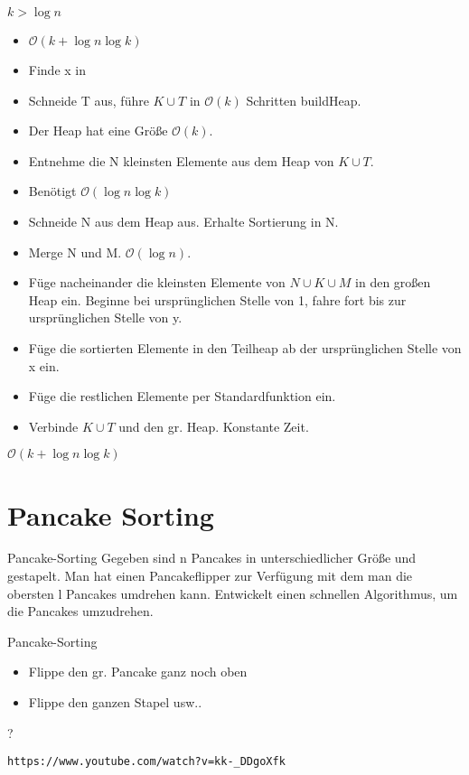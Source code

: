 \documentclass[18pt]{beamer}
\newcommand{\Oh}{\mathcal{O}}
\begin{document}
\begin{frame}{$k > \log n$}
 
 \begin{itemize}
  \item $\Oh(k + \log n \log k)$
  \item Finde x in
  \item Schneide T aus, führe $K \cup T$ in $\Oh(k)$ Schritten buildHeap.
  \item Der Heap hat eine Größe $\Oh(k)$.
  \item Entnehme die N kleinsten Elemente aus dem Heap von $K \cup T$.
  \item Benötigt $\Oh(\log n \log k)$
  \item Schneide N aus dem Heap aus. Erhalte Sortierung in N.
  \item Merge N und M. $\Oh(\log n)$.
 \item Füge nacheinander die kleinsten Elemente von $N \cup K \cup M$ in den 
 großen Heap ein. Beginne bei ursprünglichen Stelle von 1, fahre fort bis zur ursprünglichen Stelle von y.
 \item Füge die sortierten Elemente in den Teilheap ab der ursprünglichen Stelle von x ein.
 \item Füge die restlichen Elemente per Standardfunktion ein.
 \item Verbinde $K \cup T$ und den gr. Heap. Konstante Zeit.
 \end{itemize}
$\Oh(k + \log n \log k)$
\end{frame}

\section{Pancake Sorting}
\begin{frame}[fragile]{Pancake-Sorting}
 Gegeben sind n Pancakes in unterschiedlicher Größe und gestapelt. Man hat einen Pancakeflipper zur Verfügung mit dem man
 die obersten l Pancakes umdrehen kann.
 Entwickelt einen schnellen Algorithmus, um die Pancakes umzudrehen.
\end{frame}

\begin{frame}[fragile]{Pancake-Sorting}
 \begin{itemize}
  \item Flippe den gr. Pancake ganz noch oben
  \item Flippe den ganzen Stapel usw.. 
 \end{itemize}
{ \Huge ?} 
\begin{verbatim}
https://www.youtube.com/watch?v=kk-_DDgoXfk
\end{verbatim}

\end{frame}
\end{document}
